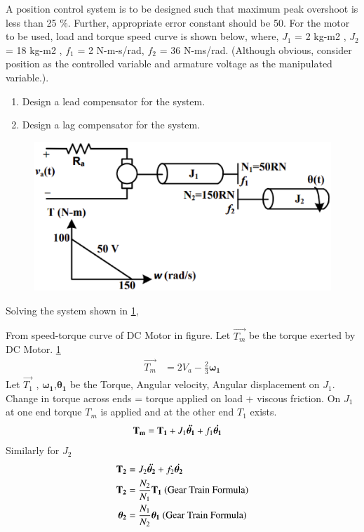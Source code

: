 \item A position control system is to be designed such that maximum peak overshoot is less than 25 \%.
Further, appropriate error constant should be 50. For the motor to be used, load and torque
speed curve is shown below, where, $J_{1}$ = 2 kg-m2
, $J_{2}$ = 18 kg-m2
, $f_{1}$ = 2 N-m-s/rad, $f_{2}$ = 36 N-ms/rad. (Although obvious, consider position as the controlled variable and armature voltage as
the manipulated variable.). 
\begin{enumerate}[label=(\roman*)]
\item Design a lead compensator for the system.
\item Design a lag compensator for the system.
\end{enumerate}

\begin{figure}[!ht]
\centering
    \includegraphics[width=\columnwidth]{./figs/ee18btech11001/ee18btech11001_1.eps}
  \caption{}
  \label{fig:ee18btech11001_fig1}
\end{figure}
%
\solution
Solving the system shown in \ref{fig:ee18btech11001_fig1},

From speed-torque curve of DC Motor in figure. Let $\vec{T_{m}}$ be the torque exerted by DC Motor.  \ref{fig:ee18btech11001_fig1}
\begin{align}
   \vec{T_{m}} &=  2V_{a} - \frac{2}{3}\bm{\omega_{1}}
    \label{eq:ee18btech11001_1}
\end{align}
Let $\vec{T_{1}}$ , $\bm{\omega_{1}}$,$\bm{\theta_1{}}$  be the Torque, Angular velocity, Angular displacement on $J_{1}$. Change in torque across ends = torque applied on load + viscous friction. On $J_{1}$ at one end torque $T_{m}$ is applied and at the other end $T_{1}$ exists.
\begin{align}
    \mathbf{T_{m}} &= \mathbf{T_{1}} + J_{1}\bm{\Ddot{\theta_{1}}} + f_{1}\bm{\Dot{\theta_{1}}} 
    \label{eq:ee18btech11001_2}
\end{align}
Similarly for $J_{2}$
\begin{align}
    \mathbf{T_{2}} &=  J_{2}\bm{\Ddot{\theta_{2}}} + f_{2}\bm{\Dot{\theta_{2}}} 
    \label{eq:ee18btech11001_3}
    \\
    \mathbf{T_{2}} &= \frac{N_{2}}{N_{1}} \mathbf{T_{1}} \text{ (Gear Train Formula)} \label{eq:ee18btech11001_4}
    \\
    \bm{\theta_{2}} &= \frac{N_{1}}{N_{2}} \bm{\theta_{1}} \text{ (Gear Train Formula)} \label{eq:ee18btech11001_5}
\end{align}
    
